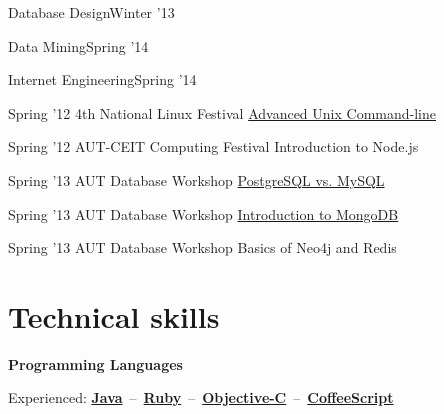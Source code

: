 \documentclass{tccv}
\begin{document}
{{\begin{ta}
\item{Database Design}{Winter '13}

\item{Data Mining}{Spring '14}

\item{Internet Engineering}{Spring '14}

\end{ta}



\vspace{15pt}


\begin{presenter}

\item{Spring '12}
	 {4th National Linux Festival}
	 {\href{http://bit.ly/linux2012}{Advanced Unix Command-line}}

\item{Spring '12}
	 {AUT-CEIT Computing Festival}
	 {Introduction to Node.js}


\item{Spring '13}
	 {AUT Database Workshop}
	 {\href{http://bit.ly/aut-postgresql}{PostgreSQL vs. MySQL}}

\item{Spring '13}
	 {AUT Database Workshop}
	 {\href{http://bit.ly/aut-mongodb}{Introduction to MongoDB}}

\item{Spring '13}
	 {AUT Database Workshop}
	 {Basics of Neo4j and Redis}
\end{presenter}


\vspace{-15pt}











\section{Technical skills}

\hspace{-1pt}%
\textsf{\textbf{Programming Languages}}
	 
\hspace{2pt}%
Experienced:
\mbox{\href{http://www.oracle.com/technetwork/java/}{\bf Java} -- %
     \href{https://www.ruby-lang.org/en/}{\bf Ruby} -- %
     \href{https://en.wikipedia.org/wiki/Objective-C}{\bf Objective-C} -- %
     \href{http://coffeescript.org}{\bf CoffeeScript}%
}

}}
\end{document}
